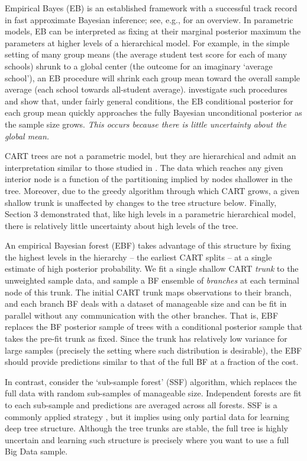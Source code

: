 \documentclass{article}
\begin{document}
Empirical Bayes (EB) is an established framework with a
successful track record in fast approximate Bayesian inference; see,
e.g., \citet{efron_large-scale_2010} for an overview. In parametric
models, EB can be interpreted as fixing at their marginal posterior
maximum  the parameters at higher levels of a hierarchical
model. For example, in the simple setting of many group means (the
average student test score for each of many schools) shrunk to a global center (the outcome for an imaginary `average school'),
an EB procedure will shrink each group mean toward the overall sample average (each school towards all-student average). \citet{kass_approximate_1989}
investigate such procedures and show that, under fairly general
conditions, the EB conditional posterior for each group mean  quickly
approaches the fully Bayesian unconditional posterior as the sample size
grows.  \textit{This occurs because there is little uncertainty about the global mean.}

CART trees are not a parametric model, but they are hierarchical and
admit an interpretation similar to those studied in
\citet{kass_approximate_1989}. The data which reaches any given interior
node is a function of the partitioning implied by nodes shallower in the
tree. Moreover, due to the greedy algorithm through which CART
grows, a given shallow trunk is unaffected by changes to the tree
structure below. Finally, Section 3 demonstrated that, like high levels in a parametric hierarchical model, there is relatively little uncertainty about high levels of the tree.

An empirical Bayesian forest (EBF) takes advantage of this structure by fixing
the highest levels in the hierarchy -- the earliest CART splits -- at a single
estimate of high posterior probability. We fit a single
shallow CART \textit{trunk} to the unweighted sample data, and  sample a
BF ensemble of \textit{branches} at each terminal node of this trunk.  The
initial CART trunk  maps observations to their branch, and each branch BF
deals with a dataset of manageable size and can be fit in parallel without any
communication with the other branches. That is, EBF replaces the BF posterior
sample of trees with a conditional posterior sample that takes the pre-fit
trunk as fixed. Since the trunk has relatively low variance for large samples
(precisely the setting where such distribution is desirable), the EBF should
provide predictions similar to that of the full BF at a fraction of the cost.

In contrast, consider the `sub-sample forest' (SSF) algorithm, which replaces the full data with random sub-samples of manageable size.  Independent forests are  fit to each sub-sample and predictions are averaged across all forests.
SSF is a commonly applied strategy \citep[e.g., see mention, but not recommendation, of it in][]{panda_planet:_2009}, but it implies using only partial data for learning deep tree structure.  Although the tree trunks are stable, the full tree is highly uncertain and learning such structure is precisely where you want to use a full Big Data sample.
\end{document}
